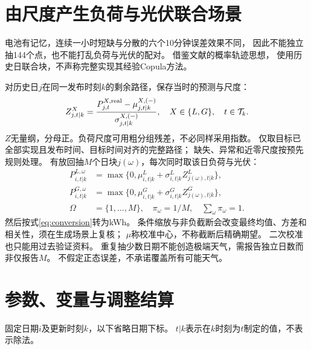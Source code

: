 \documentclass[UTF8,11pt]{ctexart}
\begin{document}
\section{由尺度产生负荷与光伏联合场景}
电池有记忆，连续一小时短缺与分散的六个10分钟误差效果不同，
因此不能独立抽144个点，也不能打乱负荷与光伏的配对。
借鉴文献\cite{lemos2022,gneiting2023}的概率轨迹思想，
使用历史日联合块，不声称完整实现其经验Copula方法。

对历史日$j$在同一发布时刻$k$的剩余路径，保存当时的预测与尺度：
\begin{equation}
 Z^X_{j,t|k}=
 \frac{P^{X,\rm real}_{j,t}-\mu^{X,(-)}_{j,t|k}}{\sigma^{X,(-)}_{j,t|k}},
 \quad X\in\{L,G\},\quad t\in\mathcal T_k .
\end{equation}
$Z$无量纲，分母正。负荷尺度可用粗分组残差，不必同样采用指数。
仅取目标已全部实现且发布时间、目标时间对齐的完整路径；
缺失、异常和近零尺度按预先规则处理。
有放回抽$M$个日块$j(\omega)$，每次同时取该日负荷与光伏：
\begin{align}
 P^{L,\omega}_{i,t|k}
 &=\max\{0,\mu^L_{i,t|k}+\sigma^L_{i,t|k}Z^L_{j(\omega),t|k}\},\\
 P^{G,\omega}_{i,t|k}
 &=\max\{0,\mu^G_{i,t|k}+\sigma^G_{i,t|k}Z^G_{j(\omega),t|k}\},\\
 \Omega&=\{1,\ldots,M\},\quad \pi_\omega=1/M,\quad\sum_\omega\pi_\omega=1.
\end{align}
然后按式\eqref{eq:conversion}转为kWh。
条件缩放与非负截断会改变最终均值、方差和相关性，须在生成场景上复核；
$\mu$称校准中心，不称截断后精确期望。
二次校准也只能用过去验证资料。
重复抽少数日期不能创造极端天气，需报告独立日数而非仅报告$M$。
不假定正态误差，不承诺覆盖所有可能天气。

\section{参数、变量与调整结算}
固定日期$i$及更新时刻$k$，以下省略日期下标。
$t|k$表示在$k$时刻为$t$制定的值，不表示除法。
\end{document}

